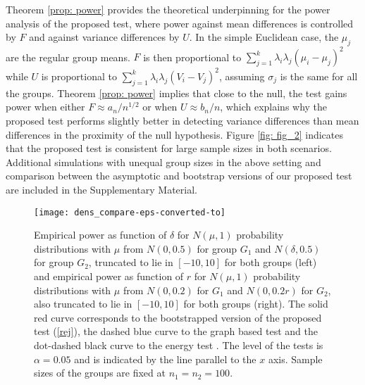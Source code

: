 \documentclass[lineno]{biometrika}
\def\cp{\citep}
\def\cp{\citep}
\begin{document}
  Theorem \ref{prop: power} provides the theoretical underpinning for  the power analysis of the proposed test, where power against mean differences is controlled by $F$ and against variance differences by $U$. In the simple Euclidean case, the $\mu_j$ are the regular group means. $F$ is then proportional to $\sum_{j=1}^{k} \lambda_i \lambda_j (\mu_i-\mu_j)^2$ while $U$ is proportional to $\sum_{j=1}^{k} \lambda_i \lambda_j (V_i-V_j)^2$, assuming $\sigma_j$ is the same for all the groups. Theorem \ref{prop: power} implies that close to the null, the test gains power when either $F \approx {a_n}/{n^{1/2}}$ or when $U \approx {b_n}/{n}$, which explains why the proposed test performs slightly better in detecting variance differences than mean differences in the proximity of the null hypothesis.
Figure \ref{fig: fig_2} indicates that  the proposed test is consistent for large sample sizes in both  scenarios. {Additional simulations with unequal group sizes in the above setting and comparison between the asymptotic and bootstrap versions of our proposed test are included in the Supplementary Material.}
 \begin{figure}
	\centering
	   \texttt{[image: dens\_compare-eps-converted-to]}
		\caption{Empirical power as function of  $\delta$ for  $N(\mu,1)$ probability distributions with $\mu$ from $N(0,0.5)$ for group $G_1$ and $N(\delta, 0.5)$  for group $G_2$, {truncated to lie in $[-10,10]$ for both groups} (left) and empirical power as function of  $r$ for  $N(\mu,1)$ probability distributions with $\mu$ from $N(0,0.2)$ for $G_1$ and $N(0,0.2r)$  for $G_2$, {also truncated to lie in $[-10,10]$ for both groups} (right).  The solid red curve corresponds to the bootstrapped version of the proposed test (\ref{rej}),  the dashed blue curve to the graph based test \cp{chen:16} and the dot-dashed black curve to the energy test \cp{szek:04}.  %
			The level of the tests is $\alpha= 0.05$ and is indicated by the line parallel to the $x$ axis. Sample sizes of the groups are fixed at $n_1=n_2=100$.}%
		\label{fig:fig_1}
    \end{figure}
\end{document}
